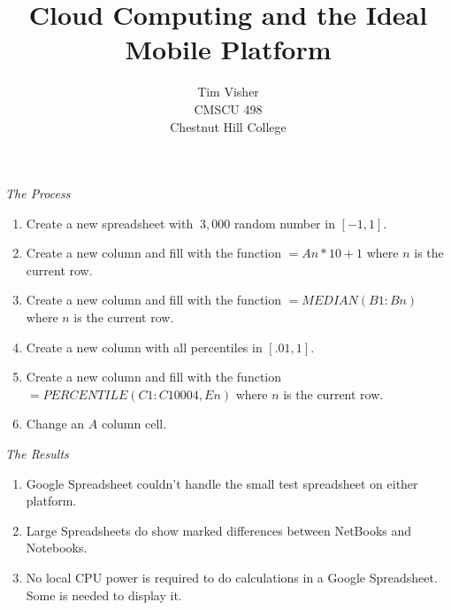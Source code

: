 \documentclass[letterpaper]{article}
\author{Tim Visher\\ CMSCU 498\\ Chestnut Hill College}
\title{Cloud Computing and the Ideal Mobile Platform}
\begin{document}
\Huge{

  \begin{center}
    \emph{The Process}
  \end{center}

\begin{enumerate}

\item Create a new spreadsheet with $~3,000$ random number in $[-1, 1]$.

\item Create a new column and fill with the function $=An*10+1$ where $n$ is the
  current row.

\item Create a new column and fill with the function $=MEDIAN(B1:Bn)$ where $n$ is
  the current row.

\item Create a new column with all percentiles in $[.01, 1]$.

\item Create a new column and fill with the function $=PERCENTILE(C1:C10004,En)$
  where $n$ is the current row.

\item Change an $A$ column cell.

\end{enumerate}

\newpage

\begin{center}
  \emph{The Results}
\end{center}

\begin{enumerate}

\item Google Spreadsheet couldn't handle the small test spreadsheet on either
  platform.

\item Large Spreadsheets do show marked differences between NetBooks and
  Notebooks.

\item No local CPU power is required to do calculations in a Google Spreadsheet.
  Some is needed to display it.

\end{enumerate}

}
\end{document}
